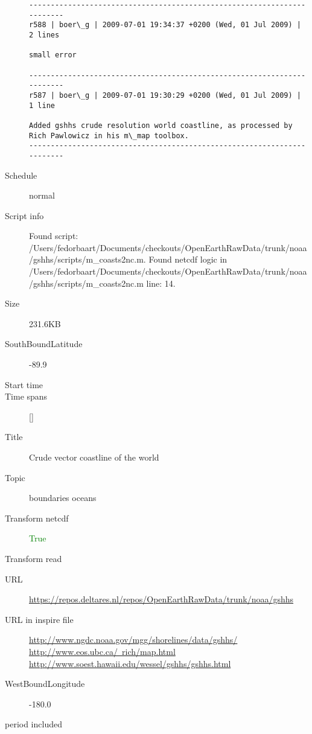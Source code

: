 \documentclass[9]{report}
\begin{document}
\begin{description}
\begin{verbatim}
------------------------------------------------------------------------
r588 | boer\_g | 2009-07-01 19:34:37 +0200 (Wed, 01 Jul 2009) | 2 lines

small error

------------------------------------------------------------------------
r587 | boer\_g | 2009-07-01 19:30:29 +0200 (Wed, 01 Jul 2009) | 1 line

Added gshhs crude resolution world coastline, as processed by Rich Pawlowicz in his m\_map toolbox.
------------------------------------------------------------------------

\end{verbatim}
  \item[Schedule] normal
  \item[Script info] Found script: /Users/fedorbaart/Documents/checkouts/OpenEarthRawData/trunk/noaa/gshhs/scripts/m\_coasts2nc.m.
Found netcdf logic in /Users/fedorbaart/Documents/checkouts/OpenEarthRawData/trunk/noaa/gshhs/scripts/m\_coasts2nc.m line: 14.
  \item[Size] 231.6KB
  \item[SouthBoundLatitude] -89.9
  \item[Start time] 
  \item[Time spans] []
  \item[Title]  Crude vector coastline of the world 
  \item[Topic] boundaries oceans
  \item[Transform netcdf] \textcolor{green}{True}
  \item[Transform read] \textcolor{blue}{}
  \item[URL] \href{https://repos.deltares.nl/repos/OpenEarthRawData/trunk/noaa/gshhs}{https://repos.deltares.nl/repos/OpenEarthRawData/trunk/noaa/gshhs}
  \item[URL in inspire file] \href{http://www.ngdc.noaa.gov/mgg/shorelines/data/gshhs/ http://www.eos.ubc.ca/~rich/map.html http://www.soest.hawaii.edu/wessel/gshhs/gshhs.html}{http://www.ngdc.noaa.gov/mgg/shorelines/data/gshhs/ http://www.eos.ubc.ca/~rich/map.html http://www.soest.hawaii.edu/wessel/gshhs/gshhs.html}
  \item[WestBoundLongitude] -180.0
  \item[period included] 
\end{description}
\end{document}
